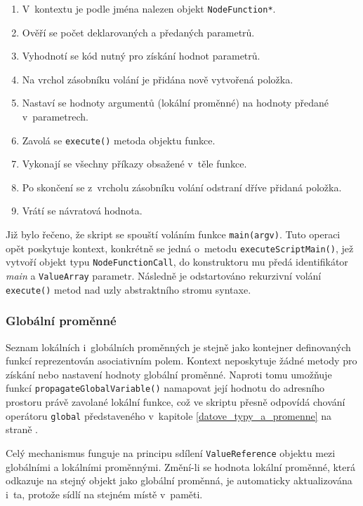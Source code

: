 \documentclass[11pt,twoside,a4paper]{book}
\begin{document}
\begin{enumerate}
\item V~kontextu je podle jména nalezen objekt \texttt{NodeFunction*}.
\item Ověří se počet deklarovaných a předaných parametrů.
\item Vyhodnotí se kód nutný pro získání hodnot parametrů.
\item Na vrchol zásobníku volání je přidána nově vytvořená položka.
\item Nastaví se hodnoty argumentů (lokální proměnné) na hodnoty předané v~parametrech.
\item Zavolá se \texttt{execute()} metoda objektu funkce.
\item Vykonají se všechny příkazy obsažené v~těle funkce.
\item Po skončení se z~vrcholu zásobníku volání odstraní dříve přidaná položka.
\item Vrátí se návratová hodnota.
\end{enumerate}

Již bylo řečeno, že skript se spouští voláním funkce \texttt{main(argv)}. Tuto operaci opět poskytuje kontext, konkrétně se jedná o~metodu \texttt{executeScriptMain()}, jež vytvoří objekt typu \texttt{NodeFunctionCall}, do konstruktoru mu předá identifikátor \textit{main} a \texttt{ValueArray} parametr. Následně je odstartováno rekurzivní volání \texttt{execute()} metod nad uzly abstraktního stromu syntaxe.


\subsubsection{Globální proměnné}

Seznam lokálních i~globálních proměnných je stejně jako kontejner definovaných funkcí reprezentován asociativním polem. Kontext neposkytuje žádné metody pro získání nebo nastavení hodnoty globální proměnné. Naproti tomu umožňuje funkcí \texttt{propagateGlobalVariable()} namapovat její hodnotu do adresního prostoru právě zavolané lokální funkce, což ve skriptu přesně odpovídá chování operátoru \texttt{global} představeného v~kapitole \ref{datove_typy_a_promenne} na straně \pageref{datove_typy_a_promenne}.

Celý mechanismus funguje na principu sdílení \texttt{ValueReference} objektu mezi globálními a lo\-kál\-ní\-mi proměnnými. Změní-li se hodnota lokální proměnné, která odkazuje na stejný objekt jako globální proměnná, je automaticky aktualizována i~ta, protože sídlí na stejném místě v~paměti.
\end{document}

